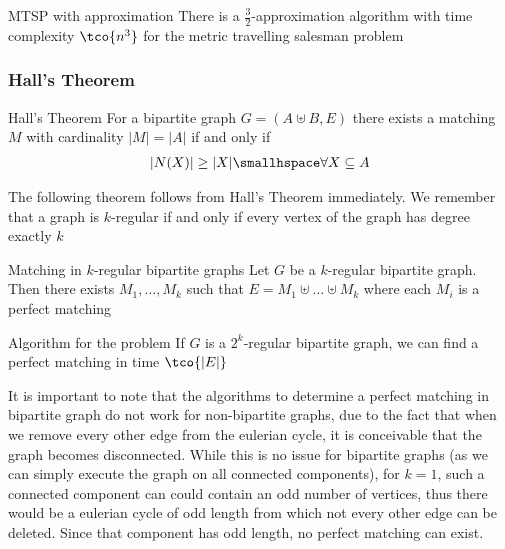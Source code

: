 \begin{theorem}[]{MTSP with approximation}
    There is a $\frac{3}{2}$-approximation algorithm with time complexity $\tco{n^3}$ for the metric travelling salesman problem
\end{theorem}

\subsubsection{Hall's Theorem}
\begin{theorem}[]{Hall's Theorem}
    For a bipartite graph $G = (A \uplus B, E)$ there exists a matching $M$ with cardinality $|M| = |A|$ if and only if
    \begin{align*}
        |N(X)| \geq |X| \smallhspace \forall X \subseteq{A}
    \end{align*}
\end{theorem}
The following theorem follows from Hall's Theorem immediately. We remember that a graph is $k$-regular if and only if every vertex of the graph has degree exactly $k$

\begin{theorem}[]{Matching in $k$-regular bipartite graphs}
    Let $G$ be a $k$-regular bipartite graph. Then there exists $M_1, \ldots, M_k$ such that $E = M_1 \uplus \ldots \uplus M_k$ where each $M_i$ is a perfect matching
\end{theorem}

\begin{theorem}[]{Algorithm for the problem}
    If $G$ is a $2^k$-regular bipartite graph, we can find a perfect matching in time $\tco{|E|}$
\end{theorem}
It is important to note that the algorithms to determine a perfect matching in bipartite graph do not work for non-bipartite graphs, due to the fact that when we remove every other edge from the eulerian cycle, it is conceivable that the graph becomes disconnected. While this is no issue for bipartite graphs (as we can simply execute the graph on all connected components), for $k = 1$, such a connected component can could contain an odd number of vertices, thus there would be a eulerian cycle of odd length from which not every other edge can be deleted. Since that component has odd length, no perfect matching can exist.

